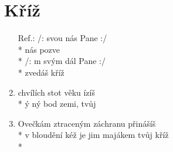 \section{Kříž}
\begin{enumerate}
\item[Ref.:] /:  svou nás Pane :/ \\*
  nás pozve  \\*
/: m svým dál Pane :/ \\*
  zvedáš kříž   
\item {} chvílích stot věku ízíš \\*
ý ný bod  zemi, tvůj   
\item Ovečkám ztraceným záchranu přinášíš \\*
v bloudění kéž je jim majákem tvůj kříž \\*
\end{enumerate}

